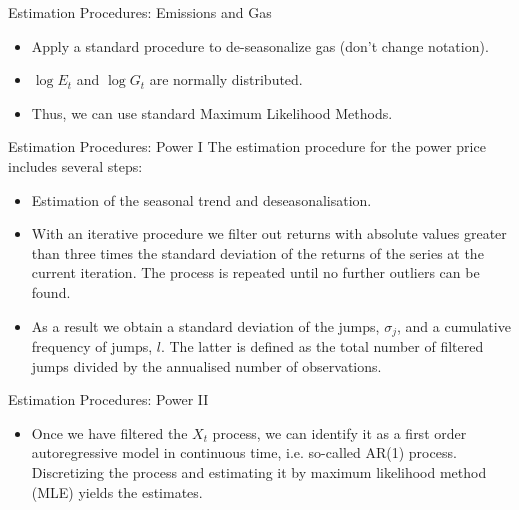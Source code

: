 {Estimation Procedures: Emissions and Gas}
\begin{itemize}
\item Apply a standard procedure to de-seasonalize gas (don't change notation).
\item $\log E_t$ and $\log G_t$ are normally distributed.
\item Thus, we can use standard Maximum Likelihood Methods.
\end{itemize}

{Estimation Procedures: Power I}
The estimation procedure for the power price includes several steps:
\begin{itemize}
\item Estimation of the seasonal trend and deseasonalisation.
\item With an iterative procedure we filter out returns with absolute values greater than three times the standard deviation of the returns of the series at the current iteration. The process is repeated until no further outliers can be found.
\item As a result we obtain a standard deviation of the jumps, $\sigma_j$, and a cumulative frequency of jumps, $l$. The latter is defined as the total number of filtered jumps divided by the annualised number of observations.
\end{itemize}

{Estimation Procedures: Power II}
\begin{itemize}
\item Once we have filtered the $X_t$ process, we can identify it as a first order autoregressive model in continuous time, i.e. so-called AR(1) process. Discretizing the process and estimating it by maximum likelihood method (MLE) yields the estimates.
\end{itemize}

